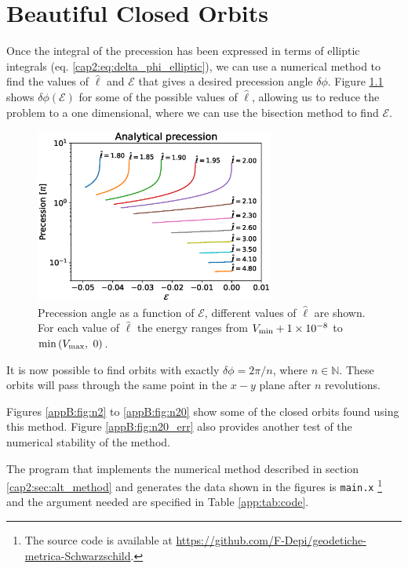 \chapter{Beautiful Closed Orbits}
\label{app:beautiful}

Once the integral of the precession has been expressed in terms of elliptic
integrals (eq. \ref{cap2:eq:delta_phi_elliptic}), we can use a numerical method
to find the values of $\hat \ell$ and $\mathcal E$ that gives a desired
precession angle $\delta \phi$.
Figure \ref{app:fig:prec_theory} shows $\delta \phi (\mathcal E)$ for some of
the possible values of $\hat \ell$, allowing us to reduce the problem to a one
dimensional, where we can use the bisection method to find $\mathcal E$.

\begin{figure}[h]
    \centering
    \includegraphics[width=0.7\textwidth]{Figures/chapter2/prec_theory.eps}
    \caption{Precession angle as a function of $\mathcal E$, different values
    of $\hat \ell$ are shown. \\
    For each value of $\hat \ell$ the energy ranges from $V_{\rm min} + 
    \num{1e-8}$ to $\min{(V_{\rm max}, ~0)}$.}
    \label{app:fig:prec_theory}
\end{figure}

It is now possible to find orbits with exactly $\delta \phi = 2 \pi / n$,
where $n \in \mathbb{N}$.
These orbits will pass through the same point in the $x-y$ plane after $n$
revolutions.

Figures \ref{appB:fig:n2} to \ref{appB:fig:n20}
show some of the closed orbits found using this method.
Figure \ref{appB:fig:n20_err} also provides another test of the numerical
stability of the method.

The program that implements the numerical method described in section
\ref{cap2:sec:alt_method} and generates the data shown in the figures is
\texttt{main.x}
\footnote{The source code is available at
\url{https://github.com/F-Depi/geodetiche-metrica-Schwarzschild}.}
and the argument needed are specified in Table \ref{app:tab:code}.

